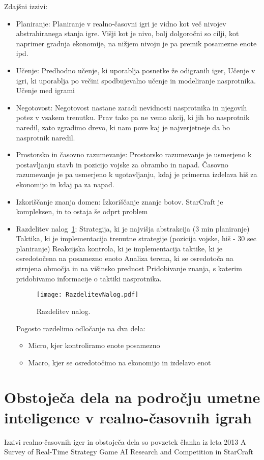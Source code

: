 \documentclass[a4paper, 12pt]{book}
\begin{document}
Zdajšni izzivi:
\begin{itemize}
\item Planiranje:
Planiranje v realno-časovni igri je vidno kot več nivojev abstrahiranega stanja igre. Višji kot je nivo, bolj dolgoročni so cilji, kot naprimer gradnja ekonomije, na nižjem nivoju je pa premik posamezne enote ipd.
\item Učenje:
Predhodno učenje, ki uporablja posnetke že odigranih iger,
Učenje v igri, ki uporablja po večini spodbujevalno učenje in modeliranje nasprotnika.
Učenje med igrami
\item Negotovost:
Negotovost nastane zaradi nevidnosti nasprotnika in njegovih potez v vsakem trenutku. Prav tako pa ne vemo akcij, ki jih bo nasprotnik naredil, zato zgradimo drevo, ki nam pove kaj je najverjetneje da bo nasprotnik naredil.
\item Prostorsko in časovno razumevanje:
Prostorsko razumevanje je usmerjeno k postavljanju stavb in pozicijo vojske za obrambo in napad.
Časovno razumevanje je pa usmerjeno k ugotavljanju, kdaj je primerna izdelava hiš za ekonomijo in kdaj pa za napad.
\item Izkoriščanje znanja domen:
Izkoriščanje znanje botov. StarCraft je kompleksen, in to ostaja še odprt problem
\item Razdelitev nalog~\ref{pic1}:
Strategija, ki je najvišja abstrakcija (3 min planiranje)
Taktika, ki je implementacija trenutne strategije (pozicija vojske, hiš - 30 sec planiranje)
Reakcijska kontrola, ki je implementacija taktike, ki je osredotočena na posamezno enoto
Analiza terena, ki se osredotoča na strnjena območja in na višinsko prednost
Pridobivanje znanja, s katerim pridobivamo informacije o taktiki nasprotnika.

\begin{figure}[h]
	\begin{center}
		\texttt{[image: RazdelitevNalog.pdf]}
	\end{center}
	\caption{Razdelitev nalog.}
	\label{pic1}
\end{figure}

Pogosto razdelimo odločanje na dva dela:
\begin{itemize}
\item Micro, kjer kontroliramo enote posamezno
\item Macro, kjer se osredotočimo na ekonomijo in izdelavo enot
\end{itemize}
\end{itemize}
\section{Obstoječa dela na področju umetne inteligence v realno-časovnih igrah}
Izzivi realno-časovnih iger in obstoječa dela so povzetek članka iz leta 2013 A Survey of Real-Time Strategy Game AI Research and Competition in StarCraft~\cite{survey_real_time_strategy_ai_research_starcraft}
\end{document}
